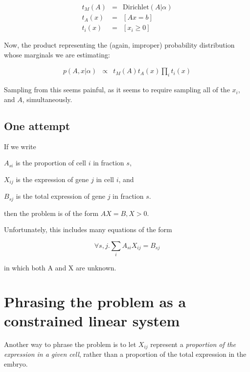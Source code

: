 \documentclass{article}
\begin{document}
\begin{eqnarray}
t_M(A) & = & \mathrm{Dirichlet}(A|\alpha) \\
t_A(x) & = & [Ax = b] \\
t_i(x) & = & [x_i \ge 0]
\end{eqnarray}

Now, the product representing the (again, improper) probability distribution
whose marginals we are estimating:

\begin{eqnarray}
p(A, x|\alpha) & \propto & t_M(A) t_A(x) \prod_i t_i(x)
\end{eqnarray}

Sampling from this seems painful, as it seems to require sampling all of
the $x_i$, and $A$, simultaneously.


\subsection{One attempt}

If we write

$A_{si}$ is the proportion of cell $i$ in fraction $s$,

$X_{ij}$ is the expression of gene $j$ in cell $i$, and

$B_{sj}$ is the total expression of gene $j$ in fraction $s$.

then the problem is of the form $AX = B, X > 0$.

Unfortunately, this includes many equations of the form

\[
\forall s, j. \sum_i A_{si} X_{ij} = B_{sj}
\]

in which both A and X are unknown.


\section{Phrasing the problem as a constrained linear system}

Another way to phrase the problem is to let $X_{ij}$ represent
a {\em proportion of the expression in a given cell}, rather than
a proportion of the total expression in the embryo.
\end{document}
